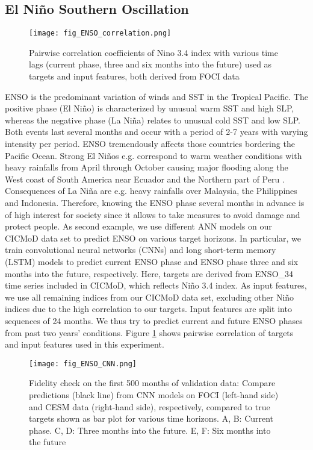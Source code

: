 \documentclass{CUP-JNL-DTM}%
\theoremstyle{definition}
\numberwithin{equation}{section}
\begin{document}
\subsection{El Ni\~{n}o Southern Oscillation \label{subsec:ENSO}}

\begin{figure}[!b]
\texttt{[image: fig\_ENSO\_correlation.png]}
\caption{Pairwise correlation coefficients of Nino 3.4 index with various time lags (current phase, three and six months into the future) used as targets and input features, both derived from FOCI data}
\label{fig:ENSO_correlation}
\end{figure}

ENSO is the predominant variation of winds and SST in the Tropical Pacific. The positive phase (El Ni\~{n}o) is characterized by unusual warm SST and high SLP, whereas the negative phase (La Ni\~{n}a) relates to unusual cold SST and low SLP. Both events last several months and occur with a period of 2-7 years with varying intensity per period. ENSO tremendously affects those countries bordering the Pacific Ocean. Strong El Ni\~{n}os e.g. correspond to warm weather conditions with heavy rainfalls from April through October causing major flooding along the West coast of South America near Ecuador and the Northern part of Peru \cite{Cai2020}. Consequences of La Ni\~{n}a are e.g. heavy rainfalls over Malaysia, the Philippines and Indonesia. Therefore, knowing the ENSO phase several months in advance is of high interest for society since it allows to take measures to avoid damage and protect people. As second example, we use different ANN models on our CICMoD data set to predict ENSO on various target horizons. In particular, we train convolutional neural networks (CNNs) and long short-term memory (LSTM) models to predict current ENSO phase and ENSO phase three and six months into the future, respectively. Here, targets are derived from ENSO\_34 time series included in CICMoD, which reflects Ni\~{n}o 3.4 index. As input features, we use all remaining indices from our CICMoD data set, excluding other Ni\~{n}o indices due to the high correlation to our targets. Input features are split into sequences of 24 months. We thus try to predict current and future ENSO phases from past two years' conditions. Figure \ref{fig:ENSO_correlation} shows pairwise correlation of targets and input features used in this experiment.

\begin{figure}[]
\texttt{[image: fig\_ENSO\_CNN.png]}
\caption{Fidelity check on the first 500 months of validation data: Compare predictions (black line) from CNN models on FOCI (left-hand side) and CESM data (right-hand side), respectively, compared to true targets shown as bar plot for various time horizons. A, B: Current phase. C, D: Three months into the future. E, F: Six months into the future}
\label{fig:ENSO_CNN}
\end{figure}
\end{document}
